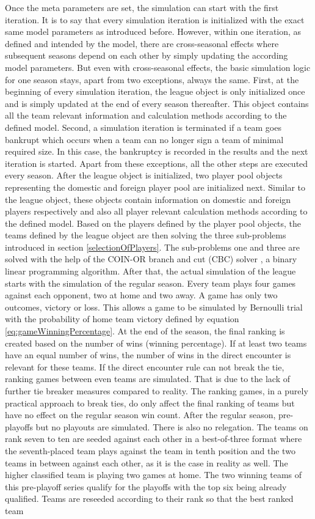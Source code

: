 \documentclass[12pt, a4paper]{article}
\begin{document}
\noindent
Once the meta parameters are set, the simulation can start with the first iteration. It is to say that every simulation iteration is initialized with the exact same model parameters as introduced before. However, within one iteration, as defined and intended by the model, there are cross-seasonal effects where subsequent seasons depend on each other by simply updating the according model parameters. But even with cross-seasonal effects, the basic simulation logic for one season stays, apart from two exceptions, always the same. First, at the beginning of every simulation iteration, the league object is only initialized once and is simply updated at the end of every season thereafter. This object contains all the team relevant information and calculation methods according to the defined model. Second, a simulation iteration is terminated if a team goes bankrupt which occurs when a team can no longer sign a team of minimal required size. In this case, the bankruptcy is recorded in the results and the next iteration is started. Apart from these exceptions, all the other steps are executed every season. After the league object is initialized, two player pool objects representing the domestic and foreign player pool are initialized next. Similar to the league object, these objects contain information on domestic and foreign players respectively and also all player relevant calculation methods according to the defined model. Based on the players defined by the player pool objects, the teams defined by the league object are then solving the three sub-problems introduced in section \ref{selectionOfPlayers}. The sub-problems one and three are solved with the help of the COIN-OR branch and cut (CBC) solver \citep[][]{forrest_coin-orcbc_2022}, a binary linear programming algorithm. After that, the actual simulation of the league starts with the simulation of the regular season. Every team plays four games against each opponent, two at home and two away. A game has only two outcomes, victory or loss. This allows a game to be simulated by Bernoulli trial with the probability of home team victory defined by equation \ref{eq:gameWinningPercentage}. At the end of the season, the final ranking is created based on the number of wins (winning percentage). If at least two teams have an equal number of wins, the number of wins in the direct encounter is relevant for these teams. If the direct encounter rule can not break the tie, ranking games between even teams are simulated. That is due to the lack of further tie breaker measures compared to reality. The ranking games, in a purely practical approach to break ties, do only affect the final ranking of teams but have no effect on the regular season win count. After the regular season, pre-playoffs but no playouts are simulated. There is also no relegation. The teams on rank seven to ten are seeded against each other in a best-of-three format where the seventh-placed team plays against the team in tenth position and the two teams in between against each other, as it is the case in reality as well. The higher classified team is playing two games at home. The two winning teams of this pre-playoff series qualify for the playoffs with the top six being already qualified. Teams are reseeded according to their rank so that the best ranked team 
\end{document}
